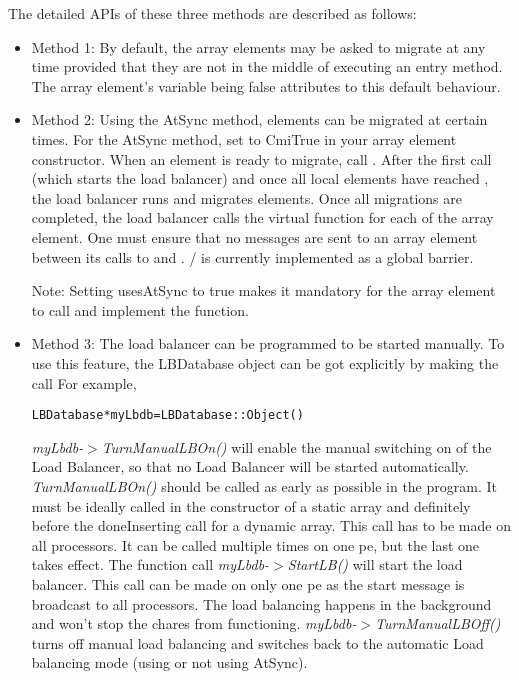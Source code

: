 The detailed APIs of these three methods are described as follows:
\begin{itemize}

\item Method 1: By default, the array elements may be asked to migrate at any time
provided that they are not in the middle of executing an entry method. 
The array element's variable  being false attributes
to this default behaviour. 

\item  Method 2: Using the AtSync method, elements can be migrated at certain
times.  For the AtSync method, set  to CmiTrue in your 
array element constructor.  When an element is ready to migrate,
call .  
After the first  call (which starts the load balancer)
and once all local elements have reached ,
the load balancer runs and migrates elements.  Once
all migrations are completed, the load balancer calls the 
virtual function  for each of the
array element.  One must ensure that no messages are
sent to an array element between its calls to  and
. / is currently
implemented as a global barrier.

Note: Setting usesAtSync to true makes it mandatory for the array
element to call  and implement the 
 function.

\item Method 3: The load balancer can be programmed to be started
manually. 
 To use this feature, the LBDatabase object
can be got explicitly by making the call 
For example, 

\begin{alltt}
LBDatabase * myLbdb = LBDatabase::Object()
\end{alltt}

{\em myLbdb-$>$TurnManualLBOn()} will enable the manual switching on of
the Load Balancer, so that no Load Balancer will be started automatically.
{\em TurnManualLBOn()} should be called as early as possible in the
program. It must be ideally called in the constructor of a static array and
definitely before the doneInserting call for a dynamic array.  This call 
has to be made on all processors. It can be called multiple times on one 
pe, but the last one takes effect.   
The function call {\em myLbdb-$>$StartLB()} will start the load balancer. 
This call can be made on only one pe as the start message is broadcast 
to all processors. The load balancing happens in the background and 
won't stop the chares from functioning. 
{\em myLbdb-$>$TurnManualLBOff()} turns off manual load balancing and switches back to the automatic Load balancing mode (using or not using AtSync). 

\end{itemize}


